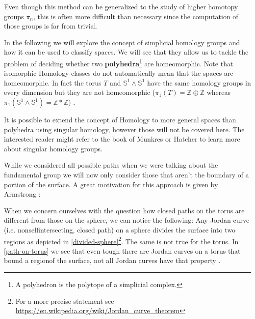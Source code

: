 \documentclass[draft,toc=bib]{scrartcl}
\theoremstyle{plain}
\theoremstyle{definition}
\theoremstyle{remark}
\newcommand{\sh}{simplicial homology}
\newcommand{\Z}{\mathbb{Z}}
\begin{document}
Even though this method can be generalized to the study of higher homotopy groups $\pi_n$, this is often more difficult than necessary since the computation of those groups is far from trivial.

In the following we will explore the concept of \sh{} groups and how it can be used to classify spaces. We will see that they allow us to tackle the problem of deciding whether two \textbf{polyhedra}\footnote{A polyhedron is the polytope of a simplicial complex.} are homeomorphic. Note that isomorphic Homology classes do not automatically mean that the spaces are homeomorphic. In fact the torus $T$ and $\mathbb{S}^1\wedge\mathbb{S}^1$ have the same homology groups in every dimension but they are not homeomorphic ($\pi_1(T)=\Z\oplus\Z$ whereas $\pi_1(\mathbb{S}^1\wedge\mathbb{S}^1)=\Z\ast\Z$) .

It is possible to extend the concept of Homology to more general spaces than polyhedra using singular homology, however those will not be covered here. The interested reader might refer to the book of Munkres \cite{mu} or Hatcher \cite{ha} to learn more about singular homology groups.

While we considered all possible paths when we were talking about the fundamental group we will now only consider those that aren't the boundary of a portion of the surface. A great motivation for this approach is given by Armstrong \cite[p. 173f]{ar}:

When we concern ourselves with the question how closed paths on the torus are different from those on the sphere, we can notice the following:
Any Jordan curve (i.e. nonselfintersecting, closed path) on a sphere divides the surface into two \glqq regions\grqq{} as depicted in \autoref{divided-sphere}\footnote{For a more precise statement see \url{https://en.wikipedia.org/wiki/Jordan_curve_theorem}}. The same is not true for the torus. In \autoref{path-on-torus} we see that even tough there are Jordan curves on a torus that bound a \glqq region\grqq of the surface, not all Jordan curves have that property \cite[see][p. 173f]{ar}.



\end{document}
